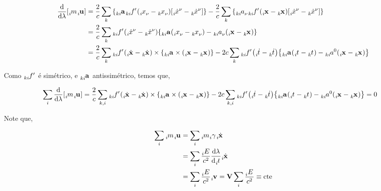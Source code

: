 \documentclass[twoside]{amsart}
\numberwithin{equation}{section}
\begin{document}
\begin{align}
    \dv{}{\lambda}\qty[\tensor[_i]{m}{}\tensor[_i]{\vb {u}}{}]&=\frac2c\sum\limits_{k}\qty{\tensor[_{ki}]{\vb{a}}{}\tensor[_{ki}]{{f'}}{}\qty(\tensor[_i]{x}{_\nu}-\tensor[_k]{x}{_\nu})\qty[\tensor[_i]{\dot{x}}{^\nu}-\tensor[_k]{\dot{x}}{^\nu}]}-\frac2c\sum\limits_k\qty{ \tensor[_{ki}]{a}{_\nu}\tensor[_{ki}]{{f'}}{}\qty(\tensor[_i]{\vb{x}}{}-\tensor[_k]{\vb{x}}{})\qty[\tensor[_i]{\dot{x}}{^\nu}-\tensor[_k]{\dot{x}}{^\nu}]}\\
    &=\frac2c\sum\limits_k\tensor[_{ki}]{{f'}}{}\qty(\tensor[_i]{\dot{x}}{^\nu}-\tensor[_k]{\dot{x}}{^\nu})\qty{\tensor[_{ki}]{\vb{a}}{}\qty(\tensor[_i]{x}{_\nu}-\tensor[_k]{x}{_\nu})- \tensor[_{ki}]{a}{_\nu}\qty(\tensor[_i]{\vb{x}}{}-\tensor[_k]{\vb{x}}{})}\\
    &=\frac2c\sum\limits_k\tensor[_{ki}]{{f'}}{}\qty(\tensor[_i]{\dot{\vb{x}}}{}-\tensor[_k]{\dot{\vb{x}}}{})\times\qty{\tensor[_{ki}]{\vb{a}}{}\times\qty(\tensor[_i]{\vb{x}}{}-\tensor[_k]{\vb{x}}{})}-2c\sum\limits_k\tensor[_{ki}]{{f'}}{}\qty(\tensor[_i]{\dot{t}}{}-\tensor[_k]{\dot{t}}{})\qty{\tensor[_{ki}]{\vb{a}}{}\qty(\tensor[_i]{t}{}-\tensor[_k]{t}{})- \tensor[_{ki}]{a}{^0}\qty(\tensor[_i]{\vb{x}}{}-\tensor[_k]{\vb{x}}{})}
\end{align}

Como $\tensor[_{ki}]{{f'}}{}$ é simétrico, e $\tensor[_{ki}]{\vb{a}}{}$ antissimétrico, temos que,

\begin{align}
    \sum\limits_i\dv{}{\lambda}\qty[\tensor[_i]{m}{}\tensor[_i]{\vb {u}}{}]&=\frac2c\sum\limits_{k,i}\tensor[_{ki}]{{f'}}{}\qty(\tensor[_i]{\dot{\vb{x}}}{}-\tensor[_k]{\dot{\vb{x}}}{})\times\qty{\tensor[_{ki}]{\vb{a}}{}\times\qty(\tensor[_i]{\vb{x}}{}-\tensor[_k]{\vb{x}}{})}-2c\sum\limits_{k,i}\tensor[_{ki}]{{f'}}{}\qty(\tensor[_i]{\dot{t}}{}-\tensor[_k]{\dot{t}}{})\qty{\tensor[_{ki}]{\vb{a}}{}\qty(\tensor[_i]{t}{}-\tensor[_k]{t}{})- \tensor[_{ki}]{a}{^0}\qty(\tensor[_i]{\vb{x}}{}-\tensor[_k]{\vb{x}}{})}=0
\end{align}

Note que,

\begin{align}
    \sum\limits_i\tensor[_i]{m}{}\tensor[_i]{\vb{u}}{}&=\sum\limits_i\tensor[_i]{m}{}\tensor[_i]{\gamma}{}\tensor[_i]{\dot{\vb{x}}}{}\\
    &=\sum\limits_i\frac{\tensor[_i]{E}{}}{c^2}\dv{\lambda}{\tensor[_i]{t}{}}\tensor[_i]{\dot{\vb{x}}}{}\\
    &=\sum\limits_i\frac{\tensor[_i]{E}{}}{c^2}\tensor[_i]{\vb{v}}{}={\vb V}\sum\limits_i\frac{\tensor[_i]{E}{}}{c^2}\equiv \mbox{cte}
\end{align}
\end{document}
